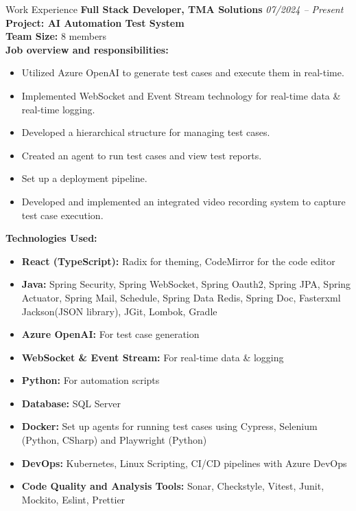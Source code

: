 \documentclass{resume} %
\begin{document}
\begin{rSection}{Work Experience}
{\bf Full Stack Developer, TMA Solutions} \hfill {\em 07/2024 – Present}
\\ \textbf{Project: AI Automation Test System}
\\ \textbf{Team Size:} 8 members
\\ \textbf{Job overview and responsibilities:}
\begin{itemize}
    \item Utilized Azure OpenAI to generate test cases and execute them in real-time.
    \item Implemented WebSocket and Event Stream technology for real-time data \& real-time logging.
    \item Developed a hierarchical structure for managing test cases.
    \item Created an agent to run test cases and view test reports.
    \item Set up a deployment pipeline.
    \item Developed and implemented an integrated video recording system to capture test case execution.
\end{itemize}
\textbf{Technologies Used:}
\begin{itemize}
    \item \textbf{React (TypeScript):} Radix for theming, CodeMirror for the code editor
    \item \textbf{Java:} Spring Security, Spring WebSocket, Spring Oauth2, Spring JPA, Spring Actuator, Spring Mail, Schedule, Spring Data Redis, Spring Doc, Fasterxml Jackson(JSON library), JGit, Lombok, Gradle
    \item \textbf{Azure OpenAI:} For test case generation
    \item \textbf{WebSocket \& Event Stream:} For real-time data \& logging 
    \item \textbf{Python:} For automation scripts
    \item \textbf{Database:} SQL Server
    \item \textbf{Docker:} Set up agents for running test cases using Cypress, Selenium (Python, CSharp) and Playwright (Python)
    \item \textbf{DevOps:} Kubernetes, Linux Scripting, CI/CD pipelines with Azure DevOps
    \item \textbf{Code Quality and Analysis Tools:} Sonar, Checkstyle, Vitest, Junit, Mockito, Eslint, Prettier
\end{itemize}


\end{rSection}
\end{document}
